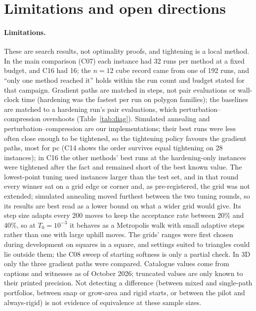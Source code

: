 \section{Limitations and open directions}\label{sec:limits}
\paragraph{Limitations.} These are search results, not optimality proofs, and tightening is a local method. In the main comparison (C07) each instance had 32 runs per method at a fixed budget, and C16 had 16; the $n=12$ cube record came from one of 192 runs, and ``only one method reached it'' holds within the run count and budget stated for that campaign. Gradient paths are matched in steps, not pair evaluations or wall-clock time (hardening was the fastest per run on polygon families); the baselines are matched to a hardening run's pair evaluations, which perturbation--compression overshoots (Table~\ref{tab:diag}). Simulated annealing and perturbation--compression are our implementations; their best runs were less often close enough to be tightened, so the tightening policy favours the gradient paths, most for pc (C14 shows the order survives equal tightening on 28 instances); in C16 the other methods' best runs at the hardening-only instances were tightened after the fact and remained short of the best known value. The lowest-point tuning used instances larger than the test set, and in that round every winner sat on a grid edge or corner and, as pre-registered, the grid was not extended; simulated annealing moved furthest between the two tuning rounds, so its results are best read as a lower bound on what a wider grid would give. Its step size adapts every 200 moves to keep the acceptance rate between 20\% and 40\%, so at $T_0=10^{-3}$ it behaves as a Metropolis walk with small adaptive steps rather than one with large uphill moves. The grids' ranges were first chosen during development on squares in a square, and settings suited to triangles could lie outside them; the C08 sweep of starting softness is only a partial check. In 3D only the three gradient paths were compared. Catalogue values come from captions and witnesses as of October 2026; truncated values are only known to their printed precision. Not detecting a difference (between mixed and single-path portfolios, between snap or grow-area and rigid starts, or between the pilot and always-rigid) is not evidence of equivalence at these sample sizes.

